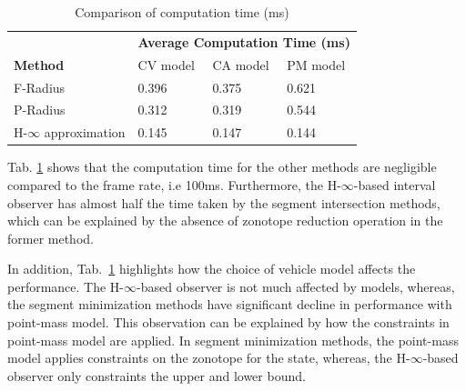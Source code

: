 \begin{table}[!h]
\caption{Comparison of computation time (ms)\\}
	\centering
	\renewcommand{\arraystretch}{1.1}
	\small	
	\begin{tabular}{l l l l}
		\toprule
		& \multicolumn{3}{c}{\textbf{Average Computation Time (ms)}}\\
		\textbf{Method} & CV model & CA model & PM model\\ \midrule
		F-Radius & 0.396 & 0.375 & 0.621 \\
		P-Radius & 0.312 & 0.319 & 0.544\\
		H-$\infty$ approximation & 0.145 & 0.147 & 0.144\\
		\bottomrule
	\end{tabular}
	\label{tab:comptime}
\end{table}
Tab. \ref{tab:comptime} shows that the computation time for the other methods are negligible compared to the frame rate, i.e 100ms. Furthermore, the H-$\infty$-based interval observer has almost half the time taken by the segment intersection methods, which can be explained by the absence of zonotope reduction operation in the former method. 

In addition, Tab.~\ref{tab:comptime} highlights how the choice of vehicle model affects the performance. The H-$\infty$-based observer is not much affected by models, whereas, the segment minimization methods have significant decline in performance with point-mass model. This observation can be explained by how the constraints in point-mass model are applied. In segment minimization methods, the point-mass model applies constraints on the zonotope for the state, whereas, the H-$\infty$-based observer only constraints the upper and lower bound. 

